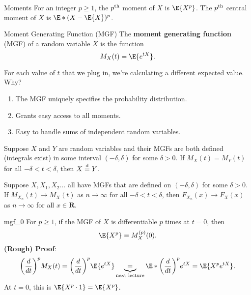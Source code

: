 \begin{Definition}{Moments}{}
    For an integer $ p\ge 1 $, the $ p\textsuperscript{th} $
    moment of $ X $ is $ \E{X^p} $. The $ p\textsuperscript{th} $
    central moment of $ X $ is
    $ \E*{(X-\E{X})^p} $.
\end{Definition}
\begin{Definition}{Moment Generating Function (MGF)}{}
    The \textbf{moment generating function} (MGF) of a random variable
    $ X $ is the function
    \[ M_X(t)=\E{e^{tX}}. \]
\end{Definition}
\begin{Remark}{}{}
    For each value of $ t $ that we plug in, we're calculating a different
    expected value. Why?
    \begin{enumerate}[(1)]
        \item The MGF uniquely specifies the probability distribution.
        \item Grants easy access to all moments.
        \item Easy to handle sums of independent random variables.
    \end{enumerate}
\end{Remark}
\begin{Theorem}{}{}
    Suppose $ X $ and $ Y $ are random variables and
    their MGFs are both defined (integrals exist)
    in some interval $ (-\delta,\delta) $ for some $ \delta>0 $.
    If $ M_X(t)=M_Y(t) $ for all $ -\delta<t<\delta $, then
    $ X\overset{\text{d}}{=} Y $.
\end{Theorem}
\begin{Theorem}{}{}
    Suppose $ X,X_1,X_2\ldots $ all have MGFs that are defined
    on $ (-\delta,\delta) $ for some $ \delta>0 $. If
    $ M_{X_n}(t)\to M_X(t) $ as $ n\to\infty $
    for all $ -\delta<t<\delta $, then
    $ F_{X_n}(x)\to F_X(x) $ as $ n\to\infty $
    for all $ x\in\mathbf{R} $.
\end{Theorem}
\begin{Theorem}{}{mgf_0}
    For $ p\ge 1 $, if the MGF of $ X $ is
    differentiable $ p $ times at $ t=0 $, then
    \[ \E{X^p}=M_X^{(p)}(0). \]
    \tcblower{}
    \textbf{(Rough) Proof}:
    \[ \biggl(\frac{d}{dt}\biggr)^p M_X(t)
        =\biggl(\frac{d}{dt}\biggr)^p \E{e^{tX}}
        \underbrace{=}_{\text{next lecture}}
        \E*{\biggl(\frac{d}{dt}\biggr)^p e^{tX}}=
        \E{X^p e^{tX}}. \]
    At $ t=0 $, this is $ \E{X^p\cdot 1}=\E{X^p} $.
\end{Theorem}
